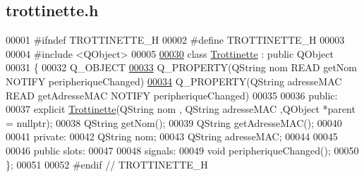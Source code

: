 \hypertarget{trottinette_8h_source}{}\subsection{trottinette.\+h}
\label{trottinette_8h_source}

\begin{DoxyCode}
00001 \textcolor{preprocessor}{#ifndef TROTTINETTE\_H}
00002 \textcolor{preprocessor}{#define TROTTINETTE\_H}
00003 
00004 \textcolor{preprocessor}{#include <QObject>}
00005 
\hyperlink{class_trottinette}{00030} \textcolor{keyword}{class }\hyperlink{class_trottinette}{Trottinette} : \textcolor{keyword}{public} QObject
00031 \{
00032     Q\_OBJECT
\hyperlink{class_trottinette_aab7d536bd21b3dbf0b9cca5508db40ab}{00033}     Q\_PROPERTY(QString nom READ getNom NOTIFY peripheriqueChanged)
\hyperlink{class_trottinette_acd01acc5c1cbf23b9b527401282f1136}{00034}     Q\_PROPERTY(QString adresseMAC READ getAdresseMAC NOTIFY peripheriqueChanged)
00035 
00036 public:
00037     explicit \hyperlink{class_trottinette}{Trottinette}(QString nom , QString adresseMAC ,QObject *parent = \textcolor{keywordtype}{nullptr}); 
00038     QString getNom(); 
00039     QString getAdresseMAC();  
00040 
00041 private:
00042     QString nom; 
00043     QString adresseMAC; 
00044 
00045 
00046 public slots:
00047 
00048 signals:
00049     \textcolor{keywordtype}{void} peripheriqueChanged(); 
00050 \};
00051 
00052 \textcolor{preprocessor}{#endif // TROTTINETTE\_H}
\end{DoxyCode}
